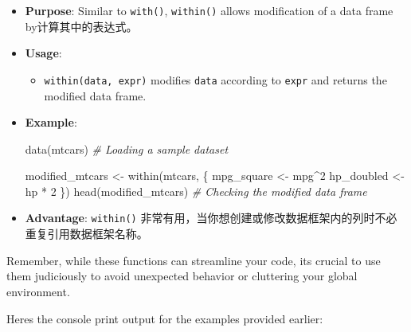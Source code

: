 \documentclass[
]{article}
\newenvironment{Shaded}{}{}
\newcommand{\CommentTok}[1]{\textcolor[rgb]{0.38,0.63,0.69}{\textit{#1}}}
\newcommand{\DecValTok}[1]{\textcolor[rgb]{0.25,0.63,0.44}{#1}}
\newcommand{\FunctionTok}[1]{\textcolor[rgb]{0.02,0.16,0.49}{#1}}
\newcommand{\NormalTok}[1]{#1}
\newcommand{\OtherTok}[1]{\textcolor[rgb]{0.00,0.44,0.13}{#1}}
\newcommand{\SpecialCharTok}[1]{\textcolor[rgb]{0.25,0.44,0.63}{#1}}
\begin{document}
\begin{itemize}
\item
  \textbf{Purpose}: Similar to \texttt{with()}, \texttt{within()} allows
  modification of a data frame by计算其中的表达式。
\item
  \textbf{Usage}:

  \begin{itemize}
  \item
    \texttt{within(data,\ expr)} modifies \texttt{data} according to
    \texttt{expr} and returns the modified data frame.
  \end{itemize}
\item
  \textbf{Example}:

\begin{Shaded}
\begin{Highlighting}[]
\FunctionTok{data}\NormalTok{(mtcars) }\CommentTok{\# Loading a sample dataset}

\NormalTok{modified\_mtcars }\OtherTok{\textless{}{-}} \FunctionTok{within}\NormalTok{(mtcars, \{}
\NormalTok{  mpg\_square }\OtherTok{\textless{}{-}}\NormalTok{ mpg}\SpecialCharTok{\^{}}\DecValTok{2}
\NormalTok{  hp\_doubled }\OtherTok{\textless{}{-}}\NormalTok{ hp }\SpecialCharTok{*} \DecValTok{2}
\NormalTok{  \})}
\FunctionTok{head}\NormalTok{(modified\_mtcars) }\CommentTok{\# Checking the modified data frame}
\end{Highlighting}
\end{Shaded}
\item
  \textbf{Advantage}: \texttt{within()}
  非常有用，当你想创建或修改数据框架内的列时不必重复引用数据框架名称。
\end{itemize}

Remember, while these functions can streamline your code,
it\textquotesingle s crucial to use them judiciously to avoid unexpected
behavior or cluttering your global environment.

Here\textquotesingle s the console print output for the examples
provided earlier:
\end{document}
